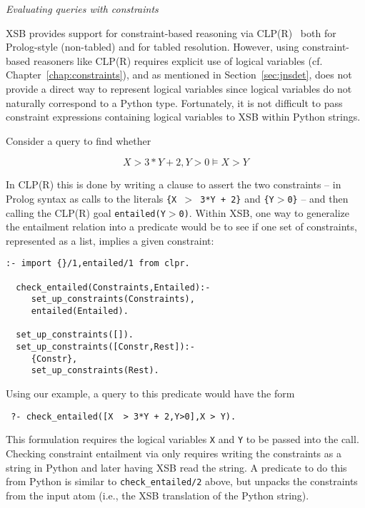 \begin{example} \rm {\it Evaluating queries with constraints} \label{ex:connstraints}

  XSB provides support for constraint-based reasoning via
  CLP(R)~\cite{Holz95} both for Prolog-style (non-tabled) and for tabled
  resolution.  However, using constraint-based reasoners like CLP(R)
  requires explicit use of logical variables
  (cf. Chapter~\ref{chap:constraints}), and as mentioned in
  Section~\ref{sec:jnsdet}, \januspy{} does not provide a direct way
  to represent logical variables since logical variables do not
  naturally correspond to a Python type.  Fortunately, it is not
  difficult to pass constraint expressions containing logical
  variables to XSB within Python strings.

  Consider a query to find whether 

  \[X  > 3*Y + 2,Y>0 \models X > Y\]

\noindent  
  In CLP(R) this is done by writing a clause to assert the two
  constraints -- in Prolog syntax as calls to the literals {\tt \{X
    $>$ 3*Y + 2\}} and {\tt \{Y$>$0\}} -- and then calling the CLP(R)
  goal {\tt entailed(Y$>$0)}.  Within XSB, one way to generalize the
  entailment relation into a predicate would be to see if one set of
  constraints, represented as a list, implies a given constraint:

{\small  
\begin{verbatim}  
:- import {}/1,entailed/1 from clpr.

  check_entailed(Constraints,Entailed):- 
     set_up_constraints(Constraints),
     entailed(Entailed).

  set_up_constraints([]).
  set_up_constraints([Constr,Rest]):- 
     {Constr},
     set_up_constraints(Rest).
\end{verbatim}
}
\noindent
Using our example, a query to this predicate would have the form

\begin{verbatim}
 ?- check_entailed([X  > 3*Y + 2,Y>0],X > Y).
\end{verbatim}
\noindent
This formulation requires the logical variables {\tt X} and {\tt Y} to
be passed into the call.  Checking constraint entailment via \januspy{}
only requires writing the constraints as a string in Python and later
having XSB read the string.  A predicate to do this from Python is
similar to {\tt check\_entailed/2} above, but unpacks the constraints
from the input atom (i.e., the XSB translation of the Python string).


\end{example}
